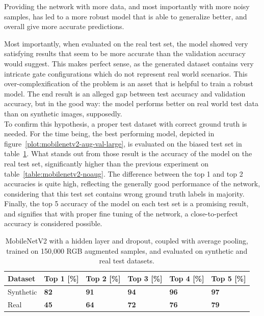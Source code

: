 Providing the network with more data, and most importantly with more noisy
samples, has led to a more robust model that is able to generalize better, and
overall give more accurate predictions.



Most importantly, when evaluated on the real test set, the model showed very
satisfying results that seem to be more accurate than the validation accuracy
would suggest. This makes perfect sense, as the generated dataset contains very
intricate gate configurations which do not represent real world scenarios. This
over-complexification of the problem is an asset that is helpful to train a
robust model. The end result is an alleged gap between test accuracy and
validation accuracy, but in the good way: the model performs better on real
world test data than on synthetic images, supposedly.\\

To confirm this hypothesis, a proper test dataset with correct ground truth is
needed. For the time being, the best performing model, depicted in
figure~\ref{plot:mobilenetv2-aug-val-large}, is evaluated on the biased test
set in table~\ref{table:mobilenetv2-best}. What stands out from those result is
the accuracy of the model on the real test set, significantly higher than the
previous experiment on table~\ref{table:mobilenetv2-noaug}. The difference
between the top 1 and top 2 accuracies is quite high, reflecting the generally
good performance of the network, considering that this test set contains
wrong ground truth labels in majority. Finally, the top 5 accuracy of the model
on each test set is a promising result, and signifies that with proper fine
tuning of the network, a close-to-perfect accuracy is considered possible.

\begin{table}[!h]
    \centering
    \caption[Top-N accuracies for MobileNetV2 on real and synthetic test
    datasets, with image augmentation]{MobileNetV2 with a hidden layer and
    dropout, coupled with average pooling, trained on 150,000 RGB augmented
    samples, and evaluated on synthetic and real test datasets.}
    \begin{tabular}{llllll}
        \toprule
		Dataset & Top 1 [\%] & Top 2 [\%] & Top 3 [\%] & Top 4 [\%] & Top 5 [\%]\\
        \midrule         
        Synthetic & \textbf{82} & \textbf{91} & \textbf{94} & \textbf{96} &
        \textbf{97} \\ 
        Real & \textbf{45} & \textbf{64} & \textbf{72} & \textbf{76} &
        \textbf{79} \\
        \bottomrule
    \end{tabular}
    \label{table:mobilenetv2-best}
\end{table}


